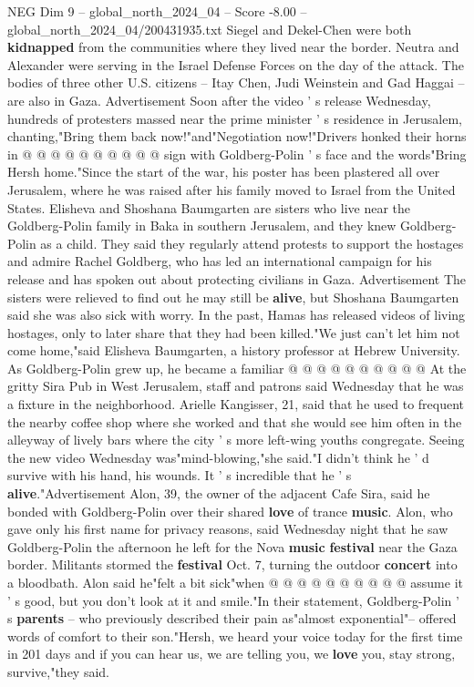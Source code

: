 \begin{textsample}{NEG Dim 9 – global\_north\_2024\_04 – Score -8.00 – global\_north\_2024\_04/200431935.txt}
Siegel and Dekel-Chen were both \textbf{kidnapped} from the communities where they lived near the border.
Neutra and Alexander were serving in the Israel Defense Forces on the day of the attack.
The bodies of three other U.S. citizens -- Itay Chen, Judi Weinstein and Gad Haggai -- are also in Gaza.
Advertisement Soon after the video ' s release Wednesday, hundreds of protesters massed near the prime minister ' s residence in Jerusalem, chanting,"Bring them back now!"and"Negotiation now!"Drivers honked their horns in @ @ @ @ @ @ @ @ @ @ sign with Goldberg-Polin ' s face and the words"Bring Hersh home."Since the start of the war, his poster has been plastered all over Jerusalem, where he was raised after his family moved to Israel from the United States.
Elisheva and Shoshana Baumgarten are sisters who live near the Goldberg-Polin family in Baka in southern Jerusalem, and they knew Goldberg-Polin as a child.
They said they regularly attend protests to support the hostages and admire Rachel Goldberg, who has led an international campaign for his release and has spoken out about protecting civilians in Gaza.
Advertisement The sisters were relieved to find out he may still be \textbf{alive}, but Shoshana Baumgarten said she was also sick with worry.
In the past, Hamas has released videos of living hostages, only to later share that they had been killed."We just can't let him not come home,"said Elisheva Baumgarten, a history professor at Hebrew University.
As Goldberg-Polin grew up, he became a familiar @ @ @ @ @ @ @ @ @ @ At the gritty Sira Pub in West Jerusalem, staff and patrons said Wednesday that he was a fixture in the neighborhood.
Arielle Kangisser, 21, said that he used to frequent the nearby coffee shop where she worked and that she would see him often in the alleyway of lively bars where the city ' s more left-wing youths congregate.
Seeing the new video Wednesday was"mind-blowing,"she said."I didn't think he ' d survive with his hand, his wounds.
It ' s incredible that he ' s \textbf{alive}."Advertisement Alon, 39, the owner of the adjacent Cafe Sira, said he bonded with Goldberg-Polin over their shared \textbf{love} of trance \textbf{music}.
Alon, who gave only his first name for privacy reasons, said Wednesday night that he saw Goldberg-Polin the afternoon he left for the Nova \textbf{music} \textbf{festival} near the Gaza border.
Militants stormed the \textbf{festival} Oct. 7, turning the outdoor \textbf{concert} into a bloodbath.
Alon said he"felt a bit sick"when @ @ @ @ @ @ @ @ @ @ assume it ' s good, but you don't look at it and smile."In their statement, Goldberg-Polin ' s \textbf{parents} -- who previously described their pain as"almost exponential"-- offered words of comfort to their son."Hersh, we heard your voice today for the first time in 201 days and if you can hear us, we are telling you, we \textbf{love} you, stay strong, survive,"they said.

\end{textsample}
